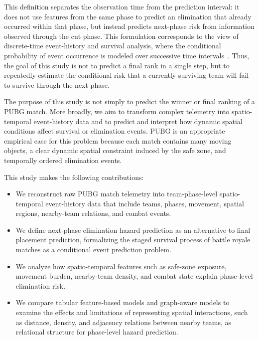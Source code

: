 This definition separates the observation time from the prediction interval: it does not use features from the same phase to predict an elimination that already occurred within that phase, but instead predicts next-phase risk from information observed through the cut phase. This formulation corresponds to the view of discrete-time event-history and survival analysis, where the conditional probability of event occurrence is modeled over successive time intervals~\cite{allison1982discrete,singer1993discrete}. Thus, the goal of this study is not to predict a final rank in a single step, but to repeatedly estimate the conditional risk that a currently surviving team will fail to survive through the next phase.

The purpose of this study is not simply to predict the winner or final ranking of a PUBG match. More broadly, we aim to transform complex telemetry into spatio-temporal event-history data and to predict and interpret how dynamic spatial conditions affect survival or elimination events. PUBG is an appropriate empirical case for this problem because each match contains many moving objects, a clear dynamic spatial constraint induced by the safe zone, and temporally ordered elimination events.

This study makes the following contributions:

\begin{itemize}
  \item We reconstruct raw PUBG match telemetry into team-phase-level spatio-temporal event-history data that include teams, phases, movement, spatial regions, nearby-team relations, and combat events.
  \item We define next-phase elimination hazard prediction as an alternative to final placement prediction, formalizing the staged survival process of battle royale matches as a conditional event prediction problem.
  \item We analyze how spatio-temporal features such as safe-zone exposure, movement burden, nearby-team density, and combat state explain phase-level elimination risk.
  \item We compare tabular feature-based models and graph-aware models to examine the effects and limitations of representing spatial interactions, such as distance, density, and adjacency relations between nearby teams, as relational structure for phase-level hazard prediction.
\end{itemize}
